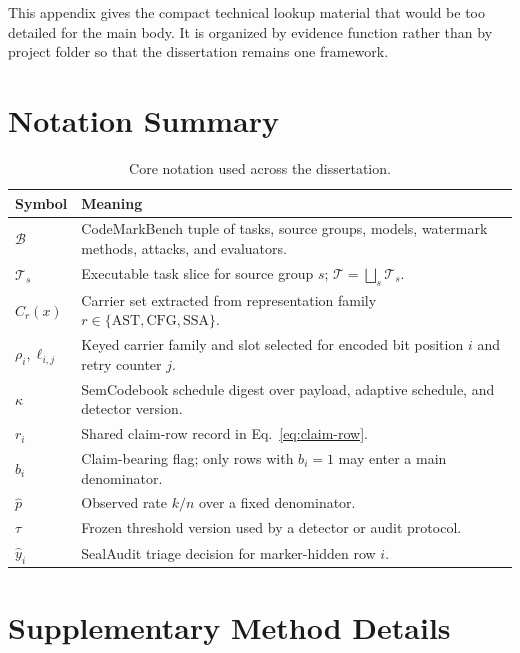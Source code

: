 
This appendix gives the compact technical lookup material that would be too detailed for the main body. It is organized by evidence function rather than by project folder so that the dissertation remains one framework.

\section{Notation Summary}

\begin{table}[htbp]
\centering
\caption{Core notation used across the dissertation.}
\label{tab:notation-summary}
\tighttable
\begin{tabularx}{\textwidth}{@{}L{1.95cm}Y@{}}
\toprule
Symbol & Meaning \\
\midrule
$\mathcal{B}$ & CodeMarkBench tuple of tasks, source groups, models, watermark methods, attacks, and evaluators. \\
$\mathcal{T}_s$ & Executable task slice for source group $s$; $\mathcal{T}=\bigsqcup_s\mathcal{T}_s$. \\
$C_r(x)$ & Carrier set extracted from representation family $r\in\{\mathrm{AST},\mathrm{CFG},\mathrm{SSA}\}$. \\
$\rho_i,\ell_{i,j}$ & Keyed carrier family and slot selected for encoded bit position $i$ and retry counter $j$. \\
$\kappa$ & SemCodebook schedule digest over payload, adaptive schedule, and detector version. \\
$r_i$ & Shared claim-row record in Eq.~\ref{eq:claim-row}. \\
$b_i$ & Claim-bearing flag; only rows with $b_i=1$ may enter a main denominator. \\
$\hat{p}$ & Observed rate $k/n$ over a fixed denominator. \\
$\tau$ & Frozen threshold version used by a detector or audit protocol. \\
$\hat{y}_i$ & SealAudit triage decision for marker-hidden row $i$. \\
\bottomrule
\end{tabularx}
\end{table}
\FloatBarrier

\section{Supplementary Method Details}


